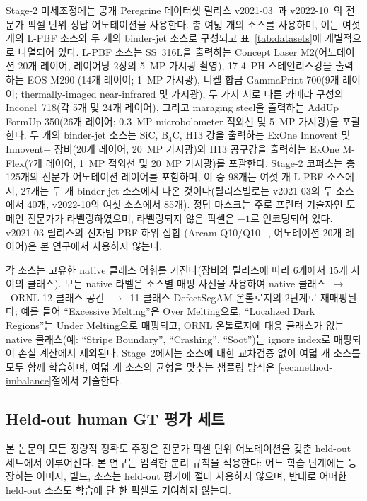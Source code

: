 Stage-2 미세조정에는 공개 Peregrine 데이터셋 릴리스
v2021-03~\cite{Peregrine_v2021_03}과 v2022-10~\cite{Peregrine_v2022_10}의
전문가 픽셀 단위 정답 어노테이션을 사용한다. 총 여덟 개의 소스를
사용하며, 이는 여섯 개의 L-PBF 소스와 두 개의 binder-jet 소스로
구성되고 표~\ref{tab:datasets}에 개별적으로 나열되어 있다. L-PBF 소스는
SS~316L을 출력하는 Concept Laser M2(어노테이션 20개 레이어, 레이어당
2장의 5~MP 가시광 촬영), 17-4~PH 스테인리스강을 출력하는 EOS M290
(14개 레이어; 1~MP 가시광), 니켈 합금 GammaPrint-700(9개 레이어;
thermally-imaged near-infrared 및 가시광), 두 가지 서로 다른 카메라
구성의 Inconel~718(각 5개 및 24개 레이어), 그리고 maraging steel을
출력하는 AddUp FormUp 350(26개 레이어; 0.3~MP microbolometer 적외선 및
5~MP 가시광)을 포괄한다. 두 개의 binder-jet 소스는 SiC, B\(_4\)C,
H13 강을 출력하는 ExOne Innovent 및 Innovent+ 장비(20개 레이어, 20~MP
가시광)와 H13 공구강을 출력하는 ExOne M-Flex(7개 레이어, 1~MP 적외선
및 20~MP 가시광)를 포괄한다. Stage-2 코퍼스는 총 125개의 전문가
어노테이션 레이어를 포함하며, 이 중 98개는 여섯 개 L-PBF 소스에서,
27개는 두 개 binder-jet 소스에서 나온 것이다(릴리스별로는 v2021-03의
두 소스에서 40개, v2022-10의 여섯 소스에서 85개). 정답 마스크는 주로
프린터 기술자인 도메인 전문가가 라벨링하였으며, 라벨링되지 않은
픽셀은 \(-1\)로 인코딩되어 있다. v2021-03 릴리스의 전자빔 PBF 하위 집합
(Arcam Q10/Q10+, 어노테이션 20개 레이어)은 본 연구에서 사용하지 않는다.

각 소스는 고유한 native 클래스 어휘를 가진다(장비와 릴리스에 따라
6개에서 15개 사이의 클래스). 모든 native 라벨은 소스별 매핑 사전을
사용하여 native 클래스~\(\rightarrow\)~ORNL 12-클래스
공간~\(\rightarrow\)~11-클래스 DefectSegAM 온톨로지의 2단계로
재매핑된다; 예를 들어 ``Excessive Melting''은 Over Melting으로,
``Localized Dark Regions''는 Under Melting으로 매핑되고, ORNL
온톨로지에 대응 클래스가 없는 native 클래스(예: ``Stripe Boundary'',
``Crashing'', ``Soot'')는 ignore index로 매핑되어 손실 계산에서 제외된다.
Stage~2에서는 소스에 대한 교차검증 없이 여덟 개 소스를 모두 함께
학습하며, 여덟 개 소스의 균형을 맞추는 샘플링 방식은
\ref{sec:method-imbalance}절에서 기술한다.

\subsection{Held-out human GT 평가 세트}
\label{sec:setup-heldout}

본 논문의 모든 정량적 정확도 주장은 전문가 픽셀 단위 어노테이션을 갖춘
held-out 세트에서 이루어진다. 본 연구는 엄격한 분리 규칙을 적용한다:
어느 학습 단계에든 등장하는 이미지, 빌드, 소스는 held-out 평가에 절대
사용하지 않으며, 반대로 어떠한 held-out 소스도 학습에 단 한 픽셀도
기여하지 않는다.

